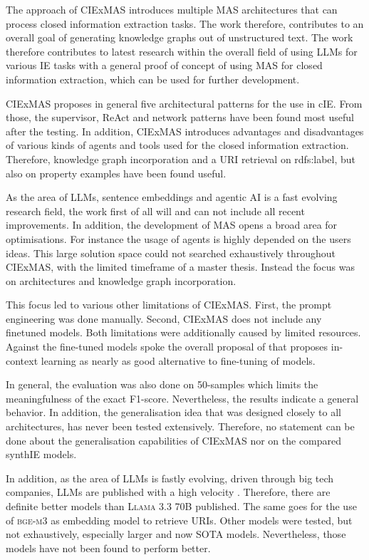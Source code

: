 \documentclass[a4paper,oneside,bibliography=totoc]{scrbook}
\begin{document}
The approach of CIExMAS introduces multiple \ac{MAS} architectures that can process closed information extraction tasks. The work therefore, contributes to an overall goal of generating knowledge graphs out of unstructured text. The work therefore contributes to latest research within the overall field of using \acp{LLM} for various \ac{IE} tasks with a general proof of concept of using \ac{MAS} for closed information extraction, which can be used for further development.

CIExMAS proposes in general five architectural patterns for the use in \ac{cIE}. From those, the supervisor, ReAct and network patterns have been found most useful after the testing. In addition, CIExMAS introduces advantages and disadvantages of various kinds of agents and tools used for the closed information extraction. Therefore, knowledge graph incorporation and a URI retrieval on rdfs:label, but also on property examples have been found useful.

As the area of \acp{LLM}, sentence embeddings and agentic AI is a fast evolving research field, the work first of all will and can not include all recent improvements. In addition, the development of \ac{MAS} opens a broad area for optimisations. For instance the usage of agents is highly depended on the users ideas. This large solution space could not searched exhaustively throughout CIExMAS, with the limited timeframe of a master thesis. Instead the focus was on architectures and knowledge graph incorporation.

This focus led to various other limitations of CIExMAS. First, the prompt engineering was done manually. Second, CIExMAS does not include any finetuned models. Both limitations were additionally caused by limited resources. Against the fine-tuned models spoke the overall proposal of \citet{Brown2020} that proposes in-context learning as nearly as good alternative to fine-tuning of models.

In general, the evaluation was also done on 50-samples which limits the meaningfulness of the exact F1-score. Nevertheless, the results indicate a general behavior. In addition, the generalisation idea that was designed closely to all architectures, has never been tested extensively. Therefore, no statement can be done about the generalisation capabilities of CIExMAS nor on the compared synthIE models.

In addition, as the area of \acp{LLM} is fastly evolving, driven through big tech companies, \acp{LLM} are published with a high velocity \cite{Brown2020,Grattafiori2024,MetaAI2025,Chiang2024}. Therefore, there are definite better models than \textsc{Llama 3.3 70B} published. The same goes for the use of \textsc{bge-m3} as embedding model to retrieve \acp{URI}. Other models were tested, but not exhaustively, especially larger and now SOTA models. Nevertheless, those models have not been found to perform better.
\end{document}
